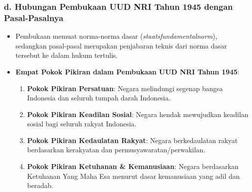 \subsubsection{d. Hubungan Pembukaan UUD NRI Tahun 1945 dengan Pasal-Pasalnya}
\begin{itemize}
    \item Pembukaan memuat norma-norma dasar (\textit{staatsfundamentalnorm}), sedangkan pasal-pasal merupakan penjabaran teknis dari norma dasar tersebut ke dalam hukum tertulis.
    \item \textbf{Empat Pokok Pikiran dalam Pembukaan UUD NRI Tahun 1945}:
    \begin{enumerate}
        \item \textbf{Pokok Pikiran Persatuan}: Negara melindungi segenap bangsa Indonesia dan seluruh tumpah darah Indonesia.
        \item \textbf{Pokok Pikiran Keadilan Sosial}: Negara hendak mewujudkan keadilan sosial bagi seluruh rakyat Indonesia.
        \item \textbf{Pokok Pikiran Kedaulatan Rakyat}: Negara berkedaulatan rakyat berdasarkan kerakyatan dan permusyawaratan/perwakilan.
        \item \textbf{Pokok Pikiran Ketuhanan \& Kemanusiaan}: Negara berdasarkan Ketuhanan Yang Maha Esa menurut dasar kemanusiaan yang adil dan beradab.
    \end{enumerate}
\end{itemize}